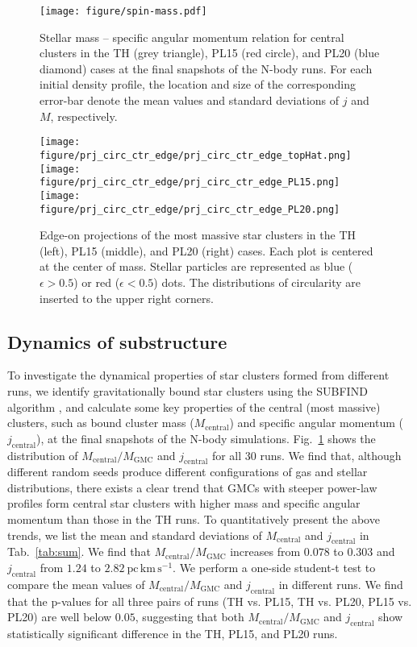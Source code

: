 \documentclass[fleqn,usenatbib]{mnras}
\begin{document}
\begin{figure}
\texttt{[image: figure/spin-mass.pdf]}
\caption{Stellar mass -- specific angular momentum relation for central clusters in the TH (grey triangle), PL15 (red circle), and PL20 (blue diamond) cases at the final snapshots of the N-body runs. For each initial density profile, the location and size of the corresponding error-bar denote the mean values and standard deviations of $j$ and $M$, respectively.
}
  \label{fig:fdisk}
\end{figure}

\begin{figure*}
\texttt{[image: figure/prj\_circ\_ctr\_edge/prj\_circ\_ctr\_edge\_topHat.png]}
\texttt{[image: figure/prj\_circ\_ctr\_edge/prj\_circ\_ctr\_edge\_PL15.png]}
\texttt{[image: figure/prj\_circ\_ctr\_edge/prj\_circ\_ctr\_edge\_PL20.png]}
\caption{Edge-on projections of the most massive star clusters in the TH (left), PL15 (middle), and PL20 (right) cases. Each plot is centered at the center of mass. Stellar particles are represented as blue ($\epsilon>0.5$) or red ($\epsilon<0.5$) dots. The distributions of circularity are inserted to the upper right corners.}
  \label{fig:prjCtr}
\end{figure*}

\subsection{Dynamics of substructure}
\label{sec:dynamics&Substructure}

To investigate the dynamical properties of star clusters formed from different runs, we identify gravitationally bound star clusters using the \textsc{SUBFIND} algorithm \citep{springel_populating_2001}, and calculate some key properties of the central (most massive) clusters, such as bound cluster mass ($M_\mathrm{central}$) and specific angular momentum ($j_\mathrm{central}$), at the final snapshots of the N-body simulations.
Fig.~\ref{fig:fdisk} shows the distribution of $M_\mathrm{central}/M_\mathrm{GMC}$ and $j_\mathrm{central}$ for all 30 runs.
We find that, although different random seeds produce different configurations of gas and stellar distributions, there exists a clear trend that GMCs with steeper power-law profiles form central star clusters with higher mass and specific angular momentum than those in the TH runs. To quantitatively present the above trends, we list the mean and standard deviations of $M_\mathrm{central}$ and $j_\mathrm{central}$ in Tab.~\ref{tab:sum}.
We find that $M_\mathrm{central}/M_\mathrm{GMC}$ increases from $0.078$ to $0.303$ and $j_\mathrm{central}$ from $1.24$ to $2.82\ \mathrm{pc\,km\,s^{-1}}$. We perform a one-side student-t test to compare the mean values of $M_\mathrm{central}/M_\mathrm{GMC}$ and $j_\mathrm{central}$ in different runs. We find that the p-values for all three pairs of runs (TH vs. PL15, TH vs. PL20, PL15 vs. PL20) are well below $0.05$, suggesting that both $M_\mathrm{central}/M_\mathrm{GMC}$ and $j_\mathrm{central}$ show statistically significant difference in the TH, PL15, and PL20 runs.
\end{document}
